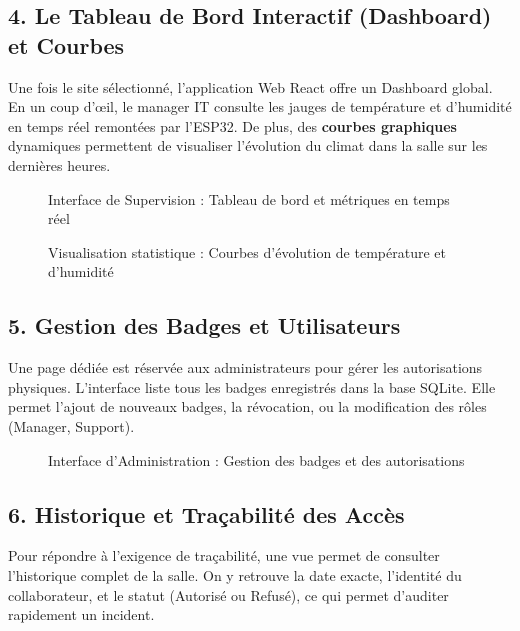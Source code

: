 \documentclass[12pt,a4paper]{report}
\begin{document}
\subsection{4. Le Tableau de Bord Interactif (Dashboard) et Courbes}
Une fois le site sélectionné, l'application Web React offre un Dashboard global. En un coup d'œil, le manager IT consulte les jauges de température et d'humidité en temps réel remontées par l'ESP32. De plus, des \textbf{courbes graphiques} dynamiques permettent de visualiser l'évolution du climat dans la salle sur les dernières heures.

\begin{figure}[h]
    \centering
    \caption{Interface de Supervision : Tableau de bord et métriques en temps réel}
\end{figure}

\begin{figure}[h]
    \centering
    \caption{Visualisation statistique : Courbes d'évolution de température et d'humidité}
\end{figure}

\subsection{5. Gestion des Badges et Utilisateurs}
Une page dédiée est réservée aux administrateurs pour gérer les autorisations physiques. L'interface liste tous les badges enregistrés dans la base SQLite. Elle permet l'ajout de nouveaux badges, la révocation, ou la modification des rôles (Manager, Support).

\begin{figure}[h]
    \centering
    \caption{Interface d'Administration : Gestion des badges et des autorisations}
\end{figure}

\subsection{6. Historique et Traçabilité des Accès}
Pour répondre à l'exigence de traçabilité, une vue permet de consulter l'historique complet de la salle. On y retrouve la date exacte, l'identité du collaborateur, et le statut (Autorisé ou Refusé), ce qui permet d'auditer rapidement un incident.
\end{document}
